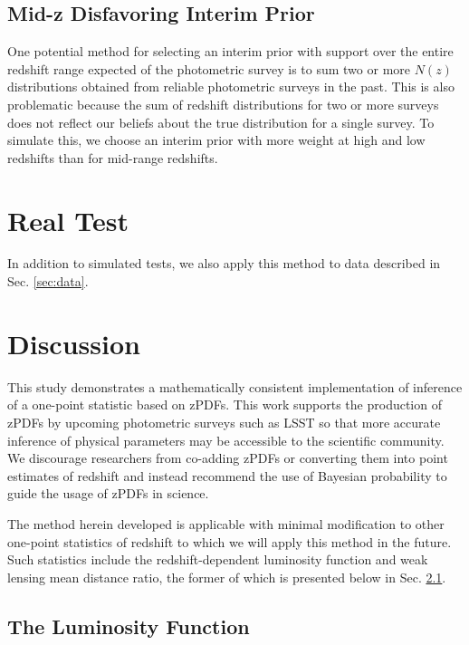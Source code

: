 \documentclass[preprint]{aastex}
\begin{document}
\clearpage
\subsection{Mid-z Disfavoring Interim Prior}
\label{sec:midz}

One potential method for selecting an interim prior with support over the 
entire redshift range expected of the photometric survey is to sum two or more 
$N(z)$ distributions obtained from reliable photometric surveys in the past.  
This is also problematic because the sum of redshift distributions for two or 
more surveys does not reflect our beliefs about the true distribution for a 
single survey.  To simulate this, we choose an interim prior with more weight 
at high and low redshifts than for mid-range redshifts.

\clearpage
\section{Real Test}
\label{sec:boss}

In addition to simulated tests, we also apply this method to data described in 
Sec. \ref{sec:data}.

\clearpage
\section{Discussion}
\label{sec:disc}

This study demonstrates a mathematically consistent implementation of inference 
of a one-point statistic based on zPDFs.  This work supports the production of 
zPDFs by upcoming photometric surveys such as LSST so that more accurate 
inference of physical parameters may be accessible to the scientific community. 
 We discourage researchers from co-adding zPDFs or converting them into point 
estimates of redshift and instead recommend the use of Bayesian probability to 
guide the usage of zPDFs in science.

The method herein developed is applicable with minimal modification to other 
one-point statistics of redshift to which we will apply this method in the 
future.  Such statistics include the redshift-dependent luminosity function and 
weak lensing mean distance ratio, the former of which is presented below in 
Sec. \ref{sec:lf}.

\clearpage
\subsection{The Luminosity Function}
\label{sec:lf}
\end{document}
